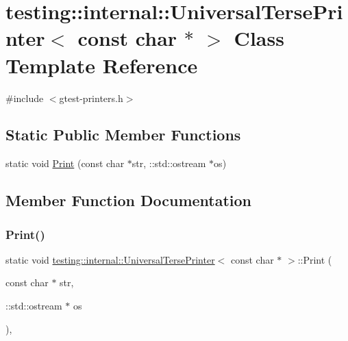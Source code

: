 \hypertarget{classtesting_1_1internal_1_1_universal_terse_printer_3_01const_01char_01_5_01_4}{}\section{testing\+::internal\+::Universal\+Terse\+Printer$<$ const char $\ast$ $>$ Class Template Reference}
\label{classtesting_1_1internal_1_1_universal_terse_printer_3_01const_01char_01_5_01_4}


{\ttfamily \#include $<$gtest-\/printers.\+h$>$}

\subsection*{Static Public Member Functions}
\begin{DoxyCompactItemize}
\item 
static void \mbox{\hyperlink{classtesting_1_1internal_1_1_universal_terse_printer_3_01const_01char_01_5_01_4_a37a3be2d26dc07b24d16c2b5eb88ecda}{Print}} (const char $\ast$str, \+::std\+::ostream $\ast$os)
\end{DoxyCompactItemize}


\subsection{Member Function Documentation}
\mbox{\label{classtesting_1_1internal_1_1_universal_terse_printer_3_01const_01char_01_5_01_4_a37a3be2d26dc07b24d16c2b5eb88ecda}} 
\subsubsection{\texorpdfstring{Print()}{Print()}}
{\footnotesize\ttfamily static void \mbox{\hyperlink{classtesting_1_1internal_1_1_universal_terse_printer}{testing\+::internal\+::\+Universal\+Terse\+Printer}}$<$ const char $\ast$ $>$\+::Print (\begin{DoxyParamCaption}\item[{const char $\ast$}]{str,  }\item[{\+::std\+::ostream $\ast$}]{os }\end{DoxyParamCaption})\hspace{0.3cm}{\ttfamily [inline]}, {\ttfamily [static]}}



